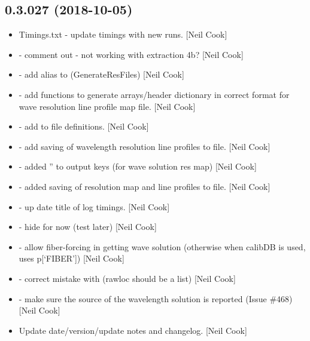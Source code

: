 \documentclass[a4paper,10pt,english]{report}
\begin{document}
\subsection{0.3.027 (2018-10-05)}
\label{\detokenize{misc/changelog:id304}}\begin{itemize}
\item {} 
Timings.txt - update timings with new runs. {[}Neil Cook{]}

\item {} 
 - comment out  - not working with
extraction 4b? {[}Neil Cook{]}

\item {} 
 - add alias to 
(GenerateResFiles) {[}Neil Cook{]}

\item {} 
 - add  functions to generate
arrays/header dictionary in correct format for wave resolution line
profile map file. {[}Neil Cook{]}

\item {} 
 - add  to file definitions. {[}Neil Cook{]}

\item {} 
 - add saving of wavelength resolution line
profiles to file. {[}Neil Cook{]}

\item {} 
 - added ” to output keys (for wave solution
res map) {[}Neil Cook{]}

\item {} 
 - added saving of resolution map and line
profiles to file. {[}Neil Cook{]}

\item {} 
 - up date title of log timings. {[}Neil Cook{]}

\item {} 
 - hide   for now (test later) {[}Neil
Cook{]}

\item {} 
 - allow fiber-forcing in getting wave solution
(otherwise when calibDB is used, uses p{[}‘FIBER’{]}) {[}Neil Cook{]}

\item {} 
 - correct mistake with  (rawloc
should be a list) {[}Neil Cook{]}

\item {} 
 - make sure the source of the wavelength solution is
reported (Issue \#468) {[}Neil Cook{]}

\item {} 
Update date/version/update notes and changelog. {[}Neil Cook{]}

\end{itemize}
\end{document}
